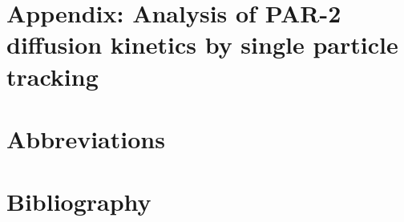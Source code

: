 \documentclass[12pt]{"article"}
\begin{document}
\clearpage
\section{Appendix: Analysis of PAR-2 diffusion kinetics by single particle tracking}


\clearpage
\section{Abbreviations}

\clearpage
\section{Bibliography}

\printbibliography
\end{document}
